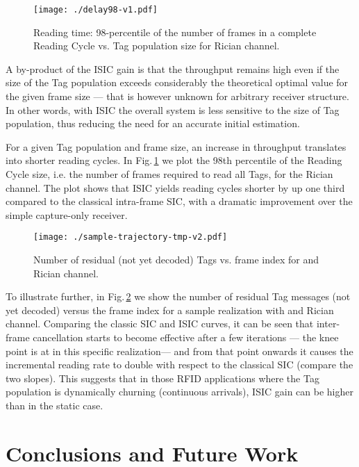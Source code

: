 \documentclass[12pt,draftcls,onecolumn]{IEEEtran}
\begin{document}
 \begin{figure}[tb]
\centering
\texttt{[image: ./delay98-v1.pdf]}

\caption{Reading time: 98-percentile of the number of frames in a complete Reading Cycle vs. Tag population size for Rician channel. }
\label{fig:delay}
\end{figure}


A by-product of the ISIC gain is that the throughput remains high even if the size of the Tag population exceeds considerably the theoretical optimal value for the given frame size --- that is however unknown for arbitrary receiver structure. In other words, with ISIC the overall system is less sensitive to the size of Tag population, thus reducing the need for an accurate initial estimation.

For a given Tag population and frame size, an increase in throughput  translates into shorter reading cycles. In Fig.\,\ref{fig:delay} we plot the 98th percentile of the Reading Cycle size, i.e. the number  of frames required to read all Tags, for the Rician channel. The plot shows that ISIC yields reading cycles shorter by up one third compared to the classical intra-frame SIC, with a dramatic improvement over the simple capture-only receiver. 



 \begin{figure}[tb]
\centering
\texttt{[image: ./sample-trajectory-tmp-v2.pdf]}

\caption{Number of residual (not yet decoded) Tags vs. frame index for  and Rician channel.  }
\label{fig:realizzazione}
\end{figure}

To illustrate further, in Fig.\,\ref{fig:realizzazione} we show the number of residual Tag messages (not yet decoded) versus the frame index  for a sample realization  with  and Rician channel.
Comparing the classic SIC and ISIC curves, it can be seen that inter-frame cancellation starts to become effective after a few iterations --- the knee point is at  in this specific realization--- and from that point onwards it causes the  incremental reading rate to double with respect to the classical SIC (compare the two slopes). This suggests that in those RFID applications where the Tag population is dynamically churning (continuous arrivals), ISIC gain can be higher than in the static case.



\section{Conclusions and Future Work}
\end{document}
